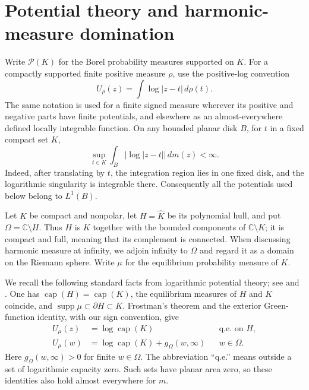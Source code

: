 \documentclass[11pt]{article}
\newcommand{\C}{\mathbb C}
\DeclareMathOperator{\caplog}{cap}
\DeclareMathOperator{\supp}{supp}
\newcommand{\Prob}{\mathcal P}
\newcommand{\qe}{\text{q.e.}}
\theoremstyle{remark}
\numberwithin{equation}{section}
\begin{document}
\section{Potential theory and harmonic-measure domination}
\label{sec:prelim}

Write $\Prob(K)$ for the Borel probability measures supported on $K$.
For a compactly supported finite positive measure $\rho$, use the
positive-log convention
\begin{equation}\label{eq:potential}
 U_\rho(z)=\int\log|z-t|\,d\rho(t).
\end{equation}
The same notation is used for a finite signed measure wherever its
positive and negative parts have finite potentials, and elsewhere as
an almost-everywhere defined locally integrable function.
On any bounded planar disk $B$, for $t$ in a fixed compact set $K$,
\begin{equation}\label{eq:log-int}
 \sup_{t\in K}\int_B |\log|z-t||\,dm(z)<\infty.
\end{equation}
Indeed, after translating by $t$, the integration region lies in one
fixed disk, and the logarithmic singularity is integrable there.
Consequently all the potentials used below belong to $L^1(B)$.

Let $K$ be compact and nonpolar, let $H=\widehat K$ be its polynomial
hull, and put $\Omega=\C\setminus H$. Thus $H$ is $K$ together with
the bounded components of $\C\setminus K$; it is compact and full,
meaning that its complement is connected. When discussing harmonic
measure at infinity, we adjoin infinity to $\Omega$ and regard it as
a domain on the Riemann sphere. Write $\mu$ for the equilibrium
probability measure of $K$.

We recall the following standard facts from logarithmic potential
theory; see \cite{Ransford1995,SaffTotik1997} and
\cite[Theorems~1.9 and~1.12, Definition~3.4]{Saff2010}.
One has $\caplog(H)=\caplog(K)$, the equilibrium measures of $H$
and $K$ coincide, and $\supp\mu\subset\partial H\subset K$.
Frostman's theorem and the exterior Green-function identity, with
our sign convention, give
\begin{align}
 U_\mu(z)&=\log\caplog(K) &&\qe\text{ on }H,\label{eq:frostman}\\
 U_\mu(w)&=\log\caplog(K)+g_\Omega(w,\infty)
       &&w\in\Omega.\label{eq:green}
\end{align}
Here $g_\Omega(w,\infty)>0$ for finite $w\in\Omega$.
The abbreviation ``q.e.'' means outside a set of logarithmic capacity
zero. Such sets have planar area zero, so these identities also hold
almost everywhere for $m$.
\end{document}
